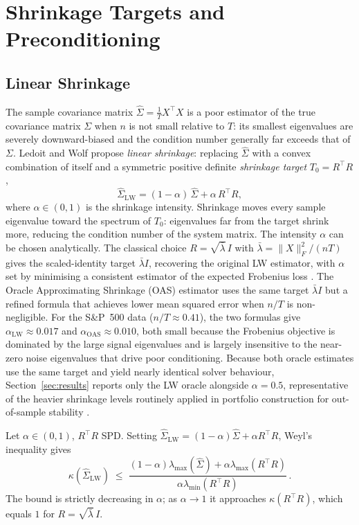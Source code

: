 \section{Shrinkage Targets and Preconditioning}\label{sec:shrinkage}
\label{sec:precond}

\subsection{Linear Shrinkage}\label{ssec:lw}

The sample covariance matrix $\hat \Sigma = \frac{1}{T}X^\top X$ is a poor estimator
of the true covariance matrix $\Sigma$ when $n$ is not small relative to $T$: its
smallest eigenvalues are severely downward-biased and the condition number generally
far exceeds that of $\Sigma$.
Ledoit and Wolf \cite{ledoit2004} propose \emph{linear shrinkage}: replacing
$\hat\Sigma$ with a convex combination of itself and a symmetric positive definite
\emph{shrinkage target} $T_0 = R^\top R$,
\[
  \hat\Sigma_{\text{LW}} = (1-\alpha)\,\hat\Sigma + \alpha\, R^\top R,
\]
where $\alpha \in (0,1)$ is the shrinkage intensity.
Shrinkage moves every sample eigenvalue toward the spectrum of $T_0$: eigenvalues far from the target shrink
more, reducing the condition number of the system matrix.
The intensity $\alpha$ can be chosen analytically. The classical choice
$R = \sqrt{\bar\lambda}\,I$ with $\bar\lambda = \|X\|_F^2/(nT)$ gives the
scaled-identity target $\bar\lambda I$, recovering the original LW estimator, with
$\alpha$ set by minimising a consistent estimator of the expected Frobenius loss
\cite{ledoit2004}. The Oracle Approximating Shrinkage (OAS) estimator
\cite{chen2010} uses the same target $\bar\lambda I$ but a refined formula that
achieves lower mean squared error when $n/T$ is non-negligible.
For the S\&P~500 data ($n/T \approx 0.41$), the two formulas give
$\alpha_{\mathrm{LW}} \approx 0.017$ and $\alpha_{\mathrm{OAS}} \approx 0.010$,
both small because the Frobenius objective is dominated by the large signal
eigenvalues and is largely insensitive to the near-zero noise eigenvalues that
drive poor conditioning. Because both oracle estimates use the same target and
yield nearly identical solver behaviour, Section~\ref{sec:results} reports only the
LW oracle alongside $\alpha = 0.5$, representative of the heavier shrinkage
levels routinely applied in portfolio construction for out-of-sample
stability \cite{demiguel2009,ledoit2003jpm}.

\begin{proposition}\label{prop:shrinkage}
  Let $\alpha \in (0,1)$, $R^\top R$ SPD. Setting
  $\hat\Sigma_{\mathrm{LW}} = (1-\alpha)\hat\Sigma + \alpha R^\top R$,
  Weyl's inequality \cite{hornjohnson2013} gives
  \[
    \kappa(\hat\Sigma_{\mathrm{LW}})
    \;\leq\;
    \frac{(1-\alpha)\lambda_{\max}(\hat\Sigma) + \alpha\lambda_{\max}(R^\top R)}
         {\alpha\lambda_{\min}(R^\top R)}\,.
  \]
  The bound is strictly decreasing in $\alpha$; as $\alpha \to 1$ it approaches
  $\kappa(R^\top R)$, which equals $1$ for $R = \sqrt{\bar\lambda}\,I$.
\end{proposition}

